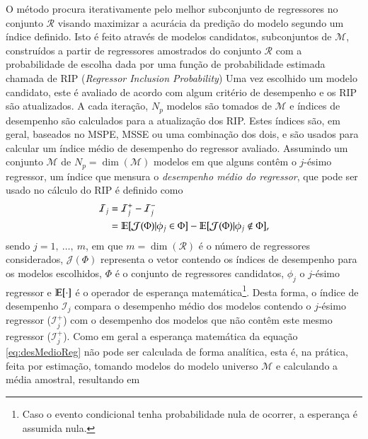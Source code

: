 O método procura iterativamente pelo melhor subconjunto de regressores no conjunto $\mathscr{R}$ visando maximizar a acurácia da predição do modelo segundo um índice definido. Isto é feito através de modelos candidatos, subconjuntos de $\mathscr{M}$, construídos a partir de regressores amostrados do conjunto $\mathscr{R}$ com a probabilidade de escolha dada por uma função de probabilidade estimada chamada de RIP (\textit{Regressor Inclusion Probability})
Uma vez escolhido um modelo candidato, este é avaliado de acordo com algum critério de desempenho e os RIP são atualizados. A cada iteração, $N_p$ modelos são tomados de $\mathscr{M}$ e índices de desempenho são calculados para a atualização dos RIP.
Estes índices são, em geral,  baseados no MSPE, MSSE ou uma combinação dos dois, e são usados para calcular um índice médio de desempenho do regressor avaliado.
Assumindo um conjunto $\mathscr{M}$ de $N_p = \dim(\mathscr{M})$ modelos em que alguns contêm o $j$-ésimo regressor, um índice que mensura o \textit{desempenho médio do regressor}, que pode ser usado no cálculo do RIP é definido como
\begin{align}
   \mathcal{I}_j &= \mathcal{I}_j^+ - \mathcal{I}_j^- \nonumber\\
      &= \mathbb{E}[\mathcal{J}(\Phi)|\phi_j \in \Phi] - \mathbb{E}[\mathcal{J}(\Phi)|\phi_j \notin \Phi],
\label{eq:desMedioReg}
\end{align}
sendo $j = 1,\ \dots,\ m$, em que  $m = \dim{(\mathscr{R})}$ é o número de regressores considerados, $\mathcal{J}(\Phi)$ representa o vetor contendo os índices de desempenho para os modelos escolhidos, $\Phi$ é o conjunto de regressores candidatos, $\phi_j$ o $j$-ésimo regressor e $\mathbb{E}[\cdot]$ é o operador de esperança matemática\footnote{Caso o evento condicional tenha probabilidade nula de ocorrer, a esperança é assumida nula.}. Desta forma, o índice de desempenho $\mathcal{I}_j$ compara o desempenho médio dos modelos contendo o $j$-ésimo regressor ($ \mathcal{I}_j^+$) com o desempenho dos modelos que não contêm este mesmo regressor ($ \mathcal{I}_j^+$). 
Como em geral a esperança matemática da equação \eqref{eq:desMedioReg} não pode ser calculada de forma analítica, esta é, na prática, feita por estimação, tomando modelos do modelo universo $\mathscr{M}$ e calculando a média amostral, resultando em
